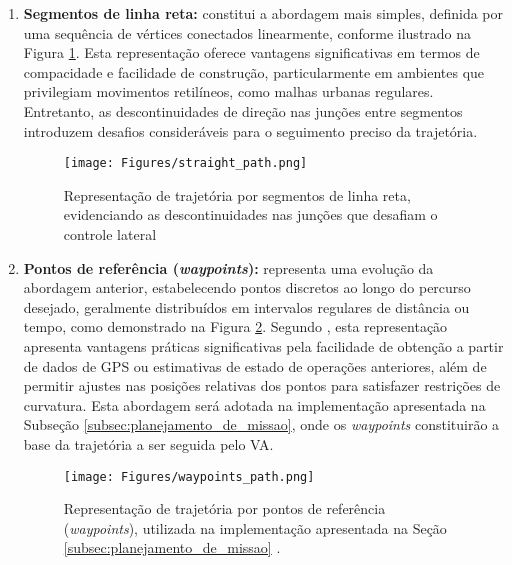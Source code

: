 \begin{enumerate}
    \item \textbf{Segmentos de linha reta:} constitui a abordagem mais simples, definida por uma sequência de vértices conectados linearmente, conforme ilustrado na Figura \ref{straight_path}. Esta representação oferece vantagens significativas em termos de compacidade e facilidade de construção, particularmente em ambientes que privilegiam movimentos retilíneos, como malhas urbanas regulares. Entretanto, as descontinuidades de direção nas junções entre segmentos introduzem desafios consideráveis para o seguimento preciso da trajetória.
    
    \begin{figure}[H]
    \centering
    \texttt{[image: Figures/straight\_path.png]}
    \caption{Representação de trajetória por segmentos de linha reta, evidenciando as descontinuidades nas junções que desafiam o controle lateral \cite[Week 6 - Lesson 1: Introduction to Lateral Vehicle Control.  ~2min52s]{University_of_Toronto2018-fe}}
    \label{straight_path}
    \end{figure}

    \item \textbf{Pontos de referência (\textit{waypoints}):} representa uma evolução da abordagem anterior, estabelecendo pontos discretos ao longo do percurso desejado, geralmente distribuídos em intervalos regulares de distância ou tempo, como demonstrado na Figura \ref{waypoints_path}. Segundo , esta representação apresenta vantagens práticas significativas pela facilidade de obtenção a partir de dados de GPS ou estimativas de estado de operações anteriores, além de permitir ajustes nas posições relativas dos pontos para satisfazer restrições de curvatura. Esta abordagem será adotada na implementação apresentada na Subseção \ref{subsec:planejamento_de_missao}, onde os \textit{waypoints} constituirão a base da trajetória a ser seguida pelo VA.
    
    \begin{figure}[H]
    \centering
    \texttt{[image: Figures/waypoints\_path.png]}
    \caption{Representação de trajetória por pontos de referência (\textit{waypoints}), utilizada na implementação apresentada na Seção \ref{subsec:planejamento_de_missao} \cite[Week 6 - Lesson 1: Introduction to Lateral Vehicle Control.  ~3min00s]{University_of_Toronto2018-fe}.}
    \label{waypoints_path}
    \end{figure}


\end{enumerate}
